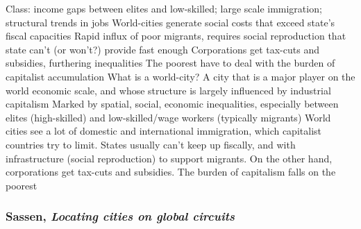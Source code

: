 \documentclass{article}
\begin{document}
\begin{outline}
			\3 Class: income gaps between elites and low-skilled; large scale immigration; structural trends in jobs
		\2 World-cities generate social costs that exceed state's fiscal capacities
			\3 Rapid influx of poor migrants, requires social reproduction that state can't (or won't?) provide fast enough
			\3 Corporations get tax-cuts and subsidies, furthering inequalities
			\3 The poorest have to deal with the burden of capitalist accumulation
	\1 What is a world-city?
		\2 A city that is a major player on the world economic scale, and whose structure is largely influenced by industrial capitalism
		\2 Marked by spatial, social, economic inequalities, especially between elites (high-skilled) and low-skilled/wage workers (typically migrants)
		\2 World cities see a lot of domestic and international immigration, which capitalist countries try to limit. States usually can't keep up fiscally, and with infrastructure (social reproduction) to support migrants.
		On the other hand, corporations get tax-cuts and subsidies. The burden of capitalism falls on the poorest
\end{outline}

\subsubsection{Sassen, \textit{Locating cities on global circuits}}
\end{document}
